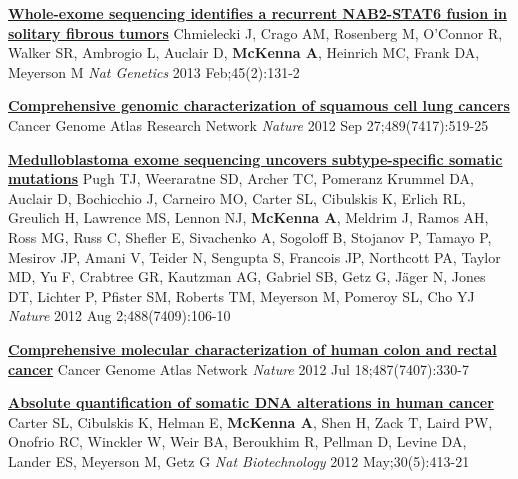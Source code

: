 \documentclass[9pt]{article}
\begin{document}
\noindent\href{https://www.ncbi.nlm.nih.gov/pubmed/23313954}{\bf  Whole-exome sequencing identifies a recurrent NAB2-STAT6 fusion in solitary fibrous tumors}\vspace{-0.03in}
\newline\noindent Chmielecki J, Crago AM, Rosenberg M, O'Connor R, Walker SR, Ambrogio L, Auclair D, \textbf{McKenna A}, Heinrich MC, Frank DA, Meyerson M
\newline\noindent\emph{ Nat Genetics} 2013 Feb;45(2):131-2
\bigskip

\noindent\href{https://www.ncbi.nlm.nih.gov/pubmed/22960745}{\bf  Comprehensive genomic characterization  of squamous cell lung cancers}\vspace{-0.03in}
\newline\noindent Cancer Genome Atlas Research Network
\newline\noindent\emph{ Nature} 2012 Sep 27;489(7417):519-25
\bigskip

\noindent\href{https://www.ncbi.nlm.nih.gov/pubmed/None}{\bf  Medulloblastoma exome sequencing uncovers subtype-specific somatic mutations}\vspace{-0.03in}
\newline\noindent Pugh TJ, Weeraratne SD, Archer TC, Pomeranz Krummel DA, Auclair D, Bochicchio J, Carneiro MO, Carter SL, Cibulskis K, Erlich RL, Greulich H, Lawrence MS, Lennon NJ, \textbf{McKenna A}, Meldrim J, Ramos AH, Ross MG, Russ C, Shefler E, Sivachenko A, Sogoloff B, Stojanov P, Tamayo P, Mesirov JP, Amani V, Teider N, Sengupta S, Francois JP, Northcott PA, Taylor MD, Yu F, Crabtree GR, Kautzman AG, Gabriel SB, Getz G, Jäger N, Jones DT, Lichter P, Pfister SM, Roberts TM, Meyerson M, Pomeroy SL, Cho YJ
\newline\noindent\emph{ Nature} 2012 Aug 2;488(7409):106-10
\bigskip

\noindent\href{https://www.ncbi.nlm.nih.gov/pubmed/22810696}{\bf  Comprehensive molecular characterization of human colon and rectal cancer}\vspace{-0.03in}
\newline\noindent Cancer Genome Atlas Network
\newline\noindent\emph{ Nature} 2012 Jul 18;487(7407):330-7
\bigskip

\noindent\href{https://www.ncbi.nlm.nih.gov/pubmed/22544022}{\bf  Absolute quantification of somatic DNA alterations in human cancer}\vspace{-0.03in}
\newline\noindent Carter SL, Cibulskis K, Helman E, \textbf{McKenna A}, Shen H, Zack T, Laird PW, Onofrio RC, Winckler W, Weir BA, Beroukhim R, Pellman D, Levine DA, Lander ES, Meyerson M, Getz G
\newline\noindent\emph{ Nat Biotechnology} 2012 May;30(5):413-21
\bigskip
\end{document}
